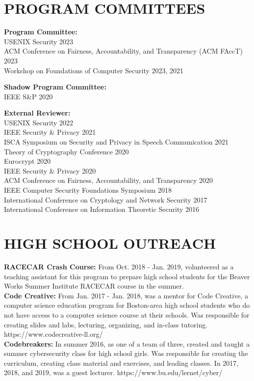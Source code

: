 \documentclass{res}
\begin{document}
\begin{resume}
\section{PROGRAM COMMITTEES}
\vspace{0.1in}

\textbf{Program Committee:} \\
USENIX Security 2023 \\
ACM Conference on Fairness, Accountability, and Transparency (ACM FAccT) 2023 \\
Workshop on Foundations of Computer Security 2023, 2021

\textbf{Shadow Program Committee:} \\
IEEE S\&P 2020

\textbf{External Reviewer:} \\
USENIX Security 2022 \\
IEEE Security \& Privacy 2021 \\
ISCA Symposium on Security and Privacy in Speech Communication 2021 \\
Theory of Cryptography Conference 2020 \\
Eurocrypt 2020 \\
IEEE Security \& Privacy 2020 \\
ACM Conference on Fairness, Accountability, and Transparency 2020 \\
IEEE Computer Security Foundations Symposium 2018 \\
International Conference on Cryptology and Network Security 2017 \\
International Conference on Information Theoretic Security 2016

\vspace{0.25in}


\section{HIGH SCHOOL OUTREACH}
\vspace{0.1in}

\textbf{RACECAR Crash Course:} From Oct. 2018 - Jan. 2019, volunteered as a teaching assistant for
this program to prepare high school students for the Beaver Works Summer Institute RACECAR course in the summer. \\
\textbf{Code Creative:} From Jan. 2017 - Jan. 2018, was a mentor for Code Creative, a computer science education
program for Boston-area high school students who do not have access to a computer science course at their schools.
Was responsible for creating slides and labs, lecturing, organizing, and in-class tutoring.
https://www.codecreative-ll.org/ \\
\textbf{Codebreakers:} In summer 2016, as one of a team of three, created and taught a summer cybersecurity class for
high school girls.  Was responsible for creating the curriculum, creating class material and exercises, and leading
classes.  In 2017, 2018, and 2019, was a guest lecturer.  https://www.bu.edu/lernet/cyber/ \\



\end{resume}
\end{document}
